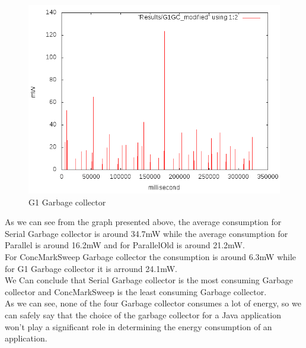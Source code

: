\begin{figure}[H]
	\centering
	\includegraphics[width=12cm,keepaspectratio]{images/G1GC.png}
	\caption{G1 Garbage collector}
\end{figure}

As we can see from the graph presented above, the average consumption for Serial Garbage collector is around 34.7mW 
while the average consumption for Parallel is around  16.2mW and for ParallelOld is around 21.2mW.\\
For ConcMarkSweep Garbage collector the consumption is around 6.3mW while for G1 Garbage collector it is arround 24.1mW.\\
We Can conclude that Serial Garbage collector is the most consuming Garbage collector and ConcMarkSweep is the least consuming Garbage collector.\\
As we can see, none of the four Garbage collector consumes a lot of energy, so we can safely say that the choice of the garbage collector for a Java application won't play a significant role in determining the energy consumption of an application.